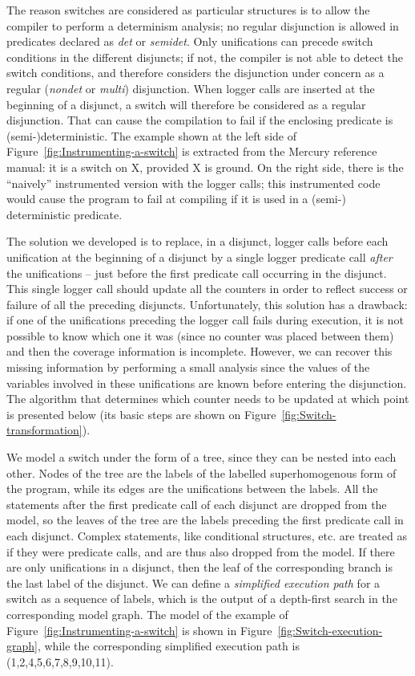 \documentclass[british]{llncs}
\begin{document}
The reason switches are considered as particular structures is to allow the compiler to perform a determinism analysis; no regular disjunction is allowed in predicates declared as \emph{det} or \emph{semidet}.
Only unifications can precede switch conditions in the different disjuncts; if not, the compiler is not able to detect the switch conditions, and therefore considers the disjunction under concern as a regular (\emph{nondet} or \emph{multi}) disjunction. 
When logger calls are inserted at the beginning of a disjunct, a switch
will therefore be considered as a regular disjunction. That can cause the compilation to fail if the enclosing predicate
is (semi-)deterministic. The example shown at the left side of Figure~\ref{fig:Instrumenting-a-switch}
is extracted from the Mercury reference manual: it is a switch on X, provided
X is ground. On the right side, there is the ``naively'' instrumented version with
the logger calls; this instrumented code would cause the program to fail at compiling if it is used in a (semi-) deterministic predicate.

The solution we developed is to replace, in a disjunct,
logger calls
before each unification at the beginning of a disjunct by a single logger predicate call \textit{after} the unifications -- just before the first predicate call occurring in the disjunct. This single logger call should update all the counters in order to
reflect success or failure of 
all the preceding disjuncts.
Unfortunately, this solution has a drawback: if one of the unifications preceding the logger call fails during execution, it is not possible to know which one it was (since no counter was placed between them) and then the coverage information is incomplete. However, we can recover this missing information by performing a small analysis since the values of the variables involved in these unifications are known before entering the disjunction.
The algorithm that determines which counter
needs to be updated at which point is presented below (its basic steps
are shown on Figure~\ref{fig:Switch-transformation}).

We model a switch under the form of a tree, since they can be nested into each
other. Nodes of the tree are the labels of the labelled superhomogenous
form of the program, while its edges are the unifications between the labels. All the
statements after the first predicate call of each disjunct are dropped from the model,
so the leaves of the tree are the labels preceding the first
predicate call in each disjunct. Complex statements,
like conditional structures, etc. are treated as if they were predicate
calls, and are thus also dropped from the model. If there are
only unifications in a disjunct, then the leaf of the corresponding branch is the
last label of the disjunct. We can define a \textit{simplified execution
path} for a switch as a sequence of labels, which is the output of
a depth-first search in the corresponding model graph. The model of
the example of Figure~\ref{fig:Instrumenting-a-switch} is shown in Figure~\ref{fig:Switch-execution-graph},
while the corresponding simplified execution path is (1,2,4,5,6,7,8,9,10,11).
\end{document}
